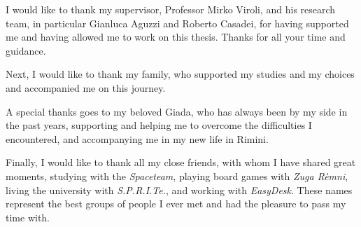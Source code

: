 \begin{acknowledgements} %
\noindent
I would like to thank my supervisor, Professor Mirko Viroli, and his research team, in particular Gianluca Aguzzi and Roberto Casadei, for having supported me and having allowed me to work on this thesis.
%
Thanks for all your time and guidance.

Next, I would like to thank my family, who supported my studies and my choices and accompanied me on this journey.

A special thanks goes to my beloved Giada, who has always been by my side in the past years, supporting and helping me to overcome the difficulties I encountered, and accompanying me in my new life in Rimini.

Finally, I would like to thank all my close friends, with whom I have shared great moments, studying with the \textit{Spaceteam}, playing board games with \textit{Zuga Rèmni}, living the university with \textit{S.P.R.I.Te.}, and working with \textit{EasyDesk}.
%
These names represent the best groups of people I ever met and had the pleasure to pass my time with.
\end{acknowledgements}
